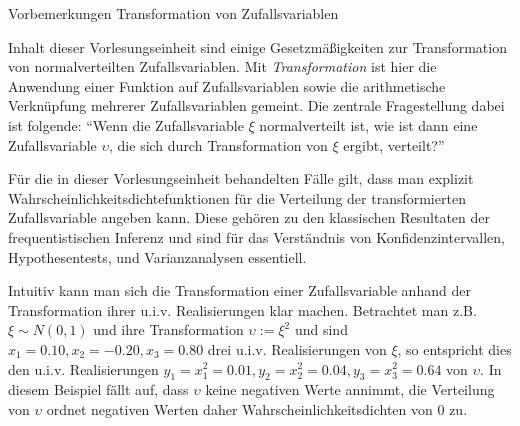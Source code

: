\documentclass[
  8pt,
  ignorenonframetext,
]{beamer}
\newcommand{\ups}{\upsilon}
\begin{document}
\begin{frame}{Vorbemerkungen}
\protect\hypertarget{vorbemerkungen-2}{}
Transformation von Zufallsvariablen

\footnotesize

Inhalt dieser Vorlesungseinheit sind einige Gesetzmäßigkeiten zur
Transformation von normalverteilten Zufallsvariablen. Mit
\textit{Transformation} ist hier die Anwendung einer Funktion auf
Zufallsvariablen sowie die arithmetische Verknüpfung mehrerer
Zufallsvariablen gemeint. Die zentrale Fragestellung dabei ist folgende:
``Wenn die Zufallsvariable \(\xi\) normalverteilt ist, wie ist dann eine
Zufallsvariable \(\ups\), die sich durch Transformation von \(\xi\)
ergibt, verteilt?''

Für die in dieser Vorlesungseinheit behandelten Fälle gilt, dass man
explizit Wahrscheinlichkeitsdichtefunktionen für die Verteilung der
transformierten Zufallsvariable angeben kann. Diese gehören zu den
klassischen Resultaten der frequentistischen Inferenz und sind für das
Verständnis von Konfidenzintervallen, Hypothesentests, und
Varianzanalysen essentiell.

Intuitiv kann man sich die Transformation einer Zufallsvariable anhand
der Transformation ihrer u.i.v. Realisierungen klar machen. Betrachtet
man z.B. \(\xi \sim N(0,1)\) und ihre Transformation \(\ups := \xi^2\)
und sind \(x_1 = 0.10, x_2 = -0.20, x_3 = 0.80\) drei u.i.v.
Realisierungen von \(\xi\), so entspricht dies den u.i.v. Realisierungen
\(y_1 = x_1^2 = 0.01, y_2 = x_2^2 = 0.04, y_3 = x_3^2 = 0.64\) von
\(\ups\). In diesem Beispiel fällt auf, dass \(\ups\) keine negativen
Werte annimmt, die Verteilung von \(\ups\) ordnet negativen Werten daher
Wahrscheinlichkeitsdichten von \(0\) zu.
\end{frame}
\end{document}
